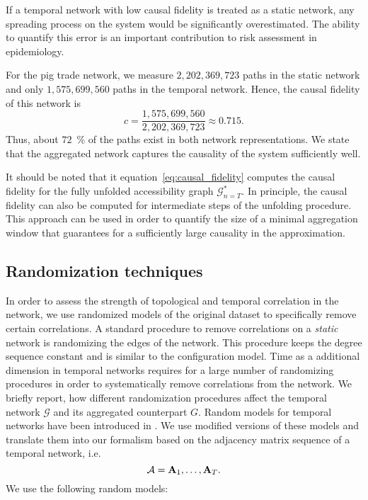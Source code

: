 If a temporal network with low causal fidelity is treated as a static network, any spreading process on the system would be significantly overestimated.
The ability to quantify this error is an important contribution to risk assessment in epidemiology.

For the pig trade network, we measure $2,202,369,723$ paths in the static network and only $1,575,699,560$ paths in the temporal network.
Hence, the causal fidelity of this network is
\begin{equation}\label{eq:pig_causal_fidelity}
c=\frac{1,575,699,560}{2,202,369,723}\approx 0.715.
\end{equation}
Thus, about $72$~\% of the paths exist in both network representations.
We state that the aggregated network captures the causality of the system sufficiently well. 

It should be noted that it equation~\eqref{eq:causal_fidelity} computes the causal fidelity for the fully unfolded accessibility graph $\mathcal{G}^*_{n=T}$.
In principle, the causal fidelity can also be computed for intermediate steps of the unfolding procedure.
This approach can be used in order to quantify the size of a minimal aggregation window that guarantees for a sufficiently large causality in the approximation.

\subsection{Randomization techniques}\label{sec:randomized_models_tvg}
In order to assess the strength of topological and temporal correlation in the network, we use randomized models of the original dataset to specifically remove certain correlations.
A standard procedure to remove correlations on a \emph{static} network is randomizing the edges of the network.
This procedure keeps the degree sequence constant and is similar to the configuration model.
Time as a additional dimension in temporal networks requires for a large number of randomizing procedures in order to systematically remove correlations from the network.
We briefly report, how different randomization procedures affect the temporal network $\mathcal{G} $ and its aggregated counterpart $G$.
Random models for temporal networks have been introduced in \citep{Holme_review,Pan:2011dga}.
We use modified versions of these models and translate them into our formalism based on the adjacency matrix sequence of a temporal network, i.e.
\begin{equation}\label{eq:AdMatrixSequence2}
\mathcal{A}=\mathbf{A}_1,\dots ,\mathbf{A}_T.
\end{equation}
We use the following random models:
%
